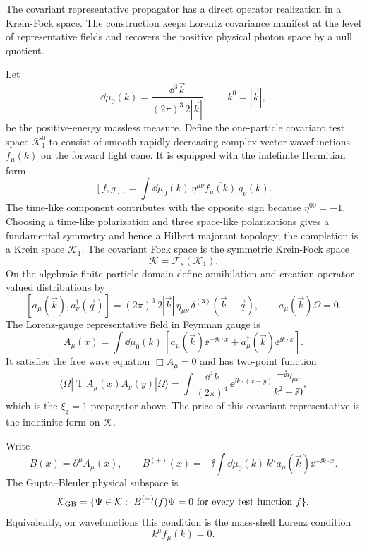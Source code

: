 \begin{definition}
\label{def:covariant-maxwell-krein-fock-representative}
The covariant representative propagator has a direct operator realization in
a Krein-Fock space.  The construction keeps Lorentz covariance manifest at
the level of representative fields and recovers the positive physical photon
space by a null quotient.

Let
\[
  \dd\mu_0(k)
  =
  \frac{\dd^3\vec k}{(2\pi)^3\,2|\vec k|},
  \qquad
  k^0=|\vec k|,
\]
be the positive-energy massless measure.  Define the one-particle covariant
test space \(\mathcal K_1^0\) to consist of smooth rapidly decreasing
complex vector wavefunctions \(f_\mu(k)\) on the forward light cone.  It is
equipped with the indefinite Hermitian form
\[
  [f,g]_1
  =
  \int \dd\mu_0(k)\,
  \eta^{\mu\nu}\overline{f_\mu(k)}\,g_\nu(k).
\]
The time-like component contributes with the opposite sign because
\(\eta^{00}=-1\).  Choosing a time-like polarization and three space-like
polarizations gives a fundamental symmetry and hence a Hilbert majorant
topology; the completion is a Krein space \(\mathcal K_1\).  The covariant
Fock space is the symmetric Krein-Fock space
\[
  \mathcal K=\mathcal F_s(\mathcal K_1).
\]
On the algebraic finite-particle domain define annihilation and creation
operator-valued distributions by
\[
  [a_\mu(\vec k),a_\nu^\dagger(\vec q)]
  =
  (2\pi)^3\,2|\vec k|\,\eta_{\mu\nu}\,
  \delta^{(3)}(\vec k-\vec q),
  \qquad
  a_\mu(\vec k)\Omega=0 .
\]
The Lorenz-gauge representative field in Feynman gauge is
\[
  A_\mu(x)
  =
  \int\dd\mu_0(k)\,
  \left[
    a_\mu(\vec k)\ee^{-\ii k\cdot x}
    +
    a_\mu^\dagger(\vec k)\ee^{\ii k\cdot x}
  \right].
\]
It satisfies the free wave equation \(\Box A_\mu=0\) and has two-point
function
\[
  \langle\Omega|
  \operatorname T A_\mu(x)A_\nu(y)
  |\Omega\rangle
  =
  \int\frac{\dd^4k}{(2\pi)^4}\,
  \ee^{\ii k\cdot(x-y)}
  \frac{-\ii\eta_{\mu\nu}}{k^2-\ii0},
\]
which is the \(\xi_{\mathrm g}=1\) propagator above.  The price of this
covariant representative is the indefinite form on \(\mathcal K\).
\end{definition}

\begin{definition}
\label{def:gupta-bleuler-physical-subspace}
Write
\[
  B(x)=\partial^\mu A_\mu(x),
  \qquad
  B^{(+)}(x)
  =
  -\ii\int\dd\mu_0(k)\,
  k^\mu a_\mu(\vec k)\ee^{-\ii k\cdot x}.
\]
The Gupta--Bleuler physical subspace is
\[
  \mathcal K_{\rm GB}
  =
  \{\Psi\in\mathcal K:\ B^{(+)}(f)\Psi=0
  \text{ for every test function } f\}.
\]
Equivalently, on wavefunctions this condition is the mass-shell Lorenz
condition
\[
  k^\mu f_\mu(k)=0 .
\]
\end{definition}

